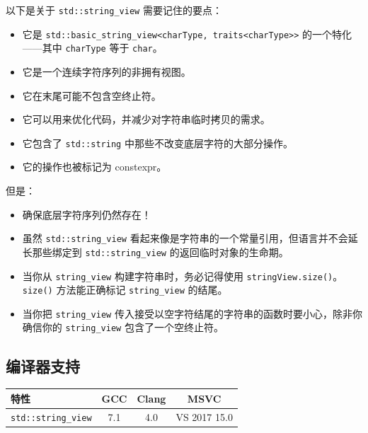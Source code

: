 以下是关于 \texttt{std::string\_view} 需要记住的要点：

\begin{itemize}
\item 它是 \texttt{std::basic\_string\_view<charType, traits<charType>>} 的一个特化——其中 \texttt{charType} 等于 \texttt{char}。
\item 它是一个连续字符序列的非拥有视图。
\item 它在末尾可能不包含空终止符。
\item 它可以用来优化代码，并减少对字符串临时拷贝的需求。
\item 它包含了 \texttt{std::string} 中那些不改变底层字符的大部分操作。
\item 它的操作也被标记为 constexpr。
\end{itemize}

但是：

\begin{itemize}
\item 确保底层字符序列仍然存在！
\item 虽然 \texttt{std::string\_view} 看起来像是字符串的一个常量引用，但语言并不会延长那些绑定到 \texttt{std::string\_view} 的返回临时对象的生命期。
\item 当你从 \texttt{string\_view} 构建字符串时，务必记得使用 \texttt{stringView.size()}。\texttt{size()} 方法能正确标记 \texttt{string\_view} 的结尾。
\item 当你把 \texttt{string\_view} 传入接受以空字符结尾的字符串的函数时要小心，除非你确信你的 \texttt{string\_view} 包含了一个空终止符。
\end{itemize}

\subsection{编译器支持}

\begin{table}[H]
\centering
\begin{tabularx}{\textwidth}{X c c c}
\toprule
特性 & GCC & Clang & MSVC \\
\midrule
\texttt{std::string\_view} & 7.1 & 4.0 & VS 2017 15.0 \\
\bottomrule
\end{tabularx}
\end{table}

